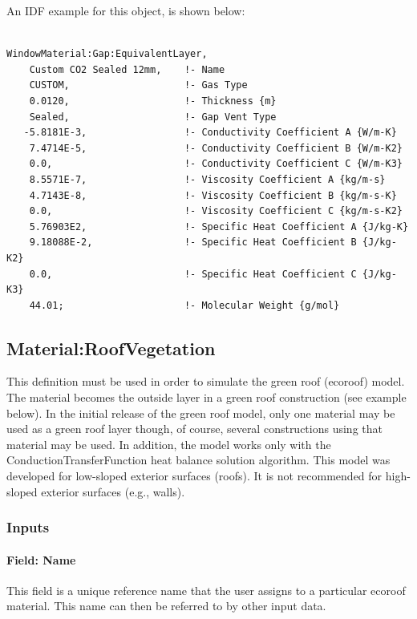An IDF example for this object, is shown below:

\begin{lstlisting}

WindowMaterial:Gap:EquivalentLayer,
    Custom CO2 Sealed 12mm,    !- Name
    CUSTOM,                    !- Gas Type
    0.0120,                    !- Thickness {m}
    Sealed,                    !- Gap Vent Type
   -5.8181E-3,                 !- Conductivity Coefficient A {W/m-K}
    7.4714E-5,                 !- Conductivity Coefficient B {W/m-K2}
    0.0,                       !- Conductivity Coefficient C {W/m-K3}
    8.5571E-7,                 !- Viscosity Coefficient A {kg/m-s}
    4.7143E-8,                 !- Viscosity Coefficient B {kg/m-s-K}
    0.0,                       !- Viscosity Coefficient C {kg/m-s-K2}
    5.76903E2,                 !- Specific Heat Coefficient A {J/kg-K}
    9.18088E-2,                !- Specific Heat Coefficient B {J/kg-K2}
    0.0,                       !- Specific Heat Coefficient C {J/kg-K3}
    44.01;                     !- Molecular Weight {g/mol}
\end{lstlisting}

\subsection{Material:RoofVegetation}\label{materialroofvegetation}

This definition must be used in order to simulate the green roof (ecoroof) model. The material becomes the outside layer in a green roof construction (see example below). In the initial release of the green roof model, only one material may be used as a green roof layer though, of course, several constructions using that material may be used. In addition, the model works only with the ConductionTransferFunction heat balance solution algorithm. This model was developed for low-sloped exterior surfaces (roofs). It is not recommended for high-sloped exterior surfaces (e.g., walls).

\subsubsection{Inputs}\label{inputs-32-000}

\paragraph{Field: Name}\label{field-name-26-002}

This field is a unique reference name that the user assigns to a particular ecoroof material. This name can then be referred to by other input data.

